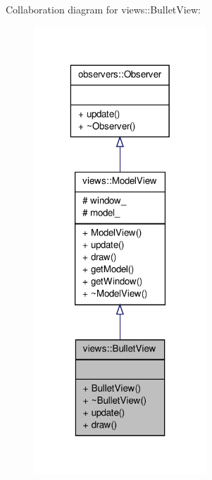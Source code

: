 \-Collaboration diagram for views\-:\-:\-Bullet\-View\-:\nopagebreak
\begin{figure}[H]
\begin{center}
\leavevmode
\includegraphics[width=184pt]{dd/d3f/classviews_1_1BulletView__coll__graph}
\end{center}
\end{figure}
